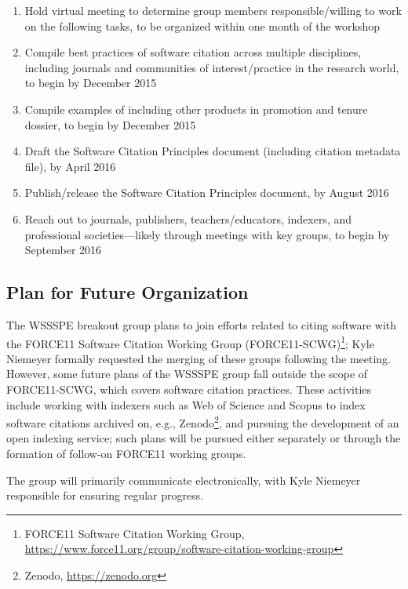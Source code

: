 \begin{enumerate}
\item Hold virtual meeting to determine group members responsible\slash willing to work on the following tasks, to be organized within one month of the workshop
\item Compile best practices of software citation across multiple disciplines, including journals and communities of interest\slash practice in the research world, to begin by December 2015
\item Compile examples of including other products in promotion and tenure dossier, to begin by December 2015
\item Draft the Software Citation Principles document (including citation metadata file), by April 2016
\item Publish\slash release the Software Citation Principles document, by August 2016
\item Reach out to journals, publishers, teachers\slash educators, indexers, and professional societies---likely through meetings with key groups, to begin by September 2016

\end{enumerate}

\subsection{Plan for Future Organization}

The WSSSPE breakout group plans to join efforts related to citing software with the FORCE11 Software Citation Working Group (FORCE11-SCWG)\footnote{FORCE11 Software Citation Working Group, \url{https://www.force11.org/group/software-citation-working-group}}; Kyle Niemeyer formally requested the merging of these groups following the meeting.
However, some future plans of the WSSSPE group fall outside the scope of FORCE11-SCWG, which covers software citation practices.
These activities include working with indexers such as Web of Science and Scopus to index software citations archived on, e.g., Zenodo\footnote{Zenodo, \url{https://zenodo.org}}, and pursuing the development of an open indexing service; such plans will be pursued either separately or through the formation of follow-on FORCE11 working groups.

The group will primarily communicate electronically, with Kyle Niemeyer responsible for ensuring regular progress.

